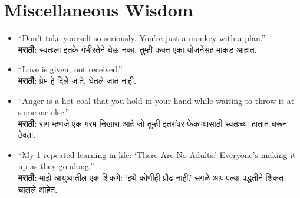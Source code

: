 \section*{Miscellaneous Wisdom}
\begin{itemize}
    \item ``Don’t take yourself so seriously. You’re just a monkey with a plan.'' \\
    \textbf{मराठी:} स्वतःला इतके गंभीरतेने घेऊ नका. तुम्ही फक्त एका योजनेसह माकड आहात.

    \item ``Love is given, not received.'' \\
    \textbf{मराठी:} प्रेम हे दिले जाते, घेतले जात नाही.

    \item ``Anger is a hot coal that you hold in your hand while waiting to throw it at someone else.'' \\
    \textbf{मराठी:} राग म्हणजे एक गरम निखारा आहे जो तुम्ही इतरांवर फेकण्यासाठी स्वतःच्या हातात धरून ठेवता.

    \item ``My 1 repeated learning in life: ‘There Are No Adults.’ Everyone’s making it up as they go along.'' \\
    \textbf{मराठी:} माझे आयुष्यातील एक शिकणे: ‘इथे कोणीही प्रौढ नाही.’ सगळे आपापल्या पद्धतीने शिकत चालले आहेत.
\end{itemize}

